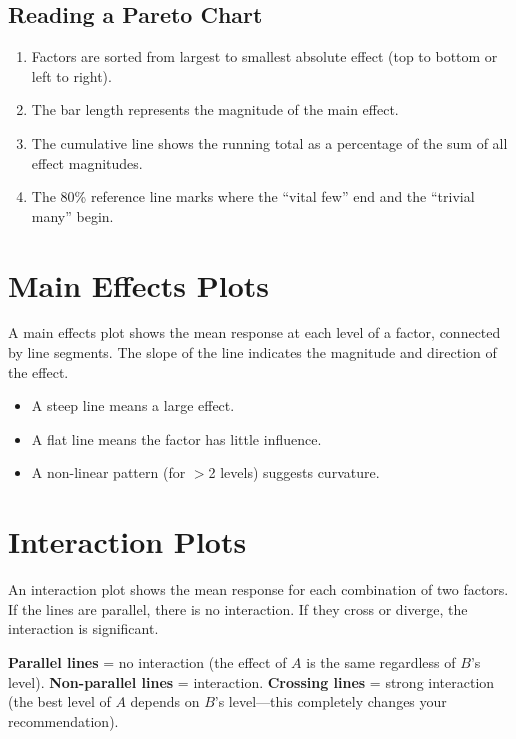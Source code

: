 \documentclass[11pt]{book}
\begin{document}
\subsection{Reading a Pareto Chart}

\begin{enumerate}[nosep]
\item Factors are sorted from largest to smallest absolute effect (top to bottom
      or left to right).
\item The bar length represents the magnitude of the main effect.
\item The cumulative line shows the running total as a percentage of the sum of
      all effect magnitudes.
\item The 80\% reference line marks where the ``vital few'' end and the
      ``trivial many'' begin.
\end{enumerate}

\section{Main Effects Plots}

A main effects plot shows the mean response at each level of a factor, connected
by line segments. The slope of the line indicates the magnitude and direction of
the effect.

\begin{itemize}[nosep]
\item A steep line means a large effect.
\item A flat line means the factor has little influence.
\item A non-linear pattern (for $>$2 levels) suggests curvature.
\end{itemize}

\section{Interaction Plots}

An interaction plot shows the mean response for each combination of two factors.
If the lines are parallel, there is no interaction. If they cross or diverge,
the interaction is significant.

\begin{keypoint}
\textbf{Parallel lines} = no interaction (the effect of $A$ is the same
regardless of $B$'s level). \textbf{Non-parallel lines} = interaction.
\textbf{Crossing lines} = strong interaction (the best level of $A$ depends
on $B$'s level---this completely changes your recommendation).
\end{keypoint}
\end{document}
